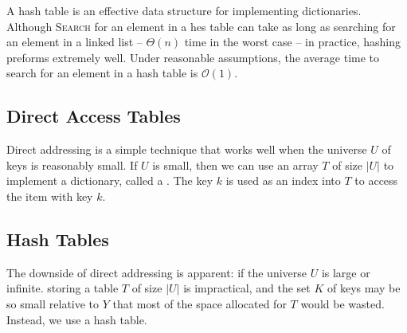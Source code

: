 
A hash table is an effective data structure for implementing dictionaries. Although \textsc{Search} for an element in a hes table can take as long as searching for an element in a linked list -- $\Theta(n)$ time in the worst case -- in practice, hashing preforms extremely well. Under reasonable assumptions, the average time to search for an element in a hash table is $\mathcal{O}(1)$. 

\subsection{Direct Access Tables}

Direct addressing is a simple technique that works well when the universe $U$ of keys is reasonably small. If $U$ is small, then we can use an array $T$ of size $|U|$ to implement a dictionary, called a . The key $k$ is used as an index into $T$ to access the item with key $k$.

\subsection{Hash Tables}

The downside of direct addressing is apparent: if the universe $U$ is large or infinite. storing a table $T$ of size $|U|$ is impractical, and the set $K$ of keys  may be so small relative to $Y$ that most of the space allocated for $T$ would be wasted. Instead, we use a hash table. 


